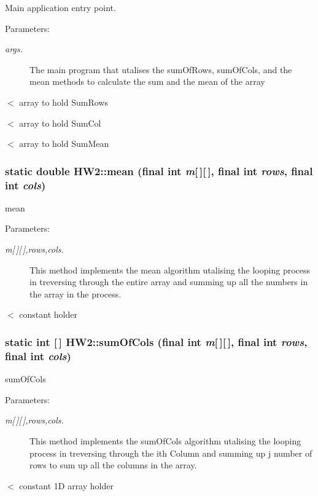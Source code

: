 Main application entry point. 

\begin{Desc}
\item[Parameters:]
\begin{description}
\item[{\em args.}]The main program that utalises the sum\-Of\-Rows, sum\-Of\-Cols, and the mean methods to calculate the sum and the mean of the array\end{description}
\end{Desc}
$<$ array to hold Sum\-Rows

$<$ array to hold Sum\-Col

$<$ array to hold Sum\-Mean 
\subsubsection{\setlength{\rightskip}{0pt plus 5cm}static double HW2::mean (final int {\em m}[$\,$][$\,$], final int {\em rows}, final int {\em cols})\hspace{0.3cm}{\tt  [inline, static]}}\label{class_h_w2_184f04025ff48c043fd2245efc15be41}


mean 

\begin{Desc}
\item[Parameters:]
\begin{description}
\item[{\em m\mbox{[}$\,$\mbox{]}\mbox{[}$\,$\mbox{]},rows,cols.}]This method implements the mean algorithm utalising the looping process in treversing through the entire array and summing up all the numbers in the array in the process.\end{description}
\end{Desc}
$<$ constant holder 
\subsubsection{\setlength{\rightskip}{0pt plus 5cm}static int [$\,$] HW2::sum\-Of\-Cols (final int {\em m}[$\,$][$\,$], final int {\em rows}, final int {\em cols})\hspace{0.3cm}{\tt  [inline, static]}}\label{class_h_w2_645e1023a3e12ff6c88383db40f0f33e}


sum\-Of\-Cols 

\begin{Desc}
\item[Parameters:]
\begin{description}
\item[{\em m\mbox{[}$\,$\mbox{]}\mbox{[}$\,$\mbox{]},rows,cols.}]This method implements the sum\-Of\-Cols algorithm utalising the looping process in treversing through the ith Column and summing up j number of rows to sum up all the columns in the array.\end{description}
\end{Desc}
$<$ constant 1D array holder 
